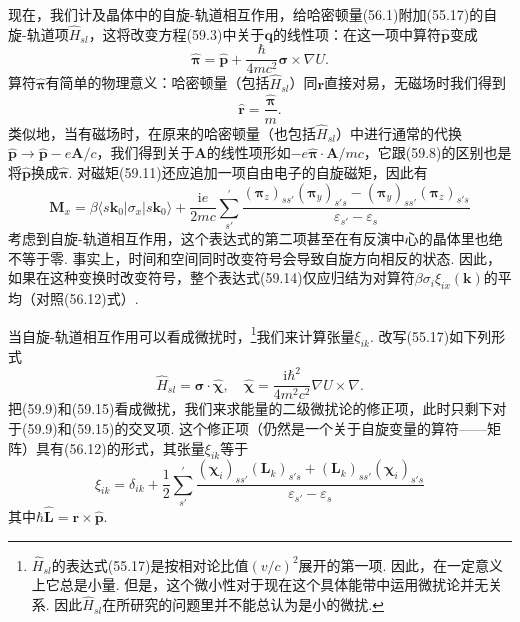 现在，我们计及晶体中的自旋-轨道相互作用，给哈密顿量(56.1)附加(55.17)的自旋-轨道项$\hat H_{sl}$，这将改变方程(59.3)中关于$\bm q$的线性项：在这一项中算符$\hat{\bm p}$变成
\begin{equation}
\hat{\bm\pi}=\hat{\bm p}+\frac{\hbar}{4mc^2}\bm\sigma\times\nabla U.
\label{59.12}
\end{equation}
算符$\hat{\bm\pi}$有简单的物理意义：哈密顿量（包括$\hat H_{sl}$）同$\bm r$直接对易，无磁场时我们得到
\begin{equation}
\hat{\bm r}=\frac{\hat{\bm\pi}}{m}.
\label{59.13}
\end{equation}
类似地，当有磁场时，在原来的哈密顿量（也包括$\hat H_{sl}$）中进行通常的代换$\hat{\bm p}\to\hat{\bm p}-e\bm A/c$，我们得到关于$\bm A$的线性项形如$-e\hat{\bm\pi}\cdot\bm A/mc$，它跟(59.8)的区别也是将$\hat{\bm p}$换成$\hat{\bm\pi}$. 对磁矩(59.11)还应追加一项自由电子的自旋磁矩，因此有
\begin{equation}
\bm M_x=\beta\langle s\bm k_0|\sigma_x|s\bm k_0\rangle+\frac{\mathrm ie}{2mc}\sum_{s'}^{\prime}
\frac{(\bm\pi_z)_{ss'}(\bm\pi_y)_{s's}-(\bm\pi_y)_{ss'}(\bm\pi_z)_{s's}}{\varepsilon_{s'}-\varepsilon_s}
\label{59.14}
\end{equation}
考虑到自旋-轨道相互作用，这个表达式的第二项甚至在有反演中心的晶体里也绝不等于零. 事实上，时间和空间同时改变符号会导致自旋方向相反的状态. 因此，如果在这种变换时改变符号，整个表达式(59.14)仅应归结为对算符$\beta\sigma_i\xi_{ix}(\bm k)$的平均（对照(56.12)式）.

当自旋-轨道相互作用可以看成微扰时，\footnote{$\hat H_{sl}$的表达式(55.17)是按相对论比值$(v/c)^2$展开的第一项. 因此，在一定意义上它总是小量. 但是，这个微小性对于现在这个具体能带中运用微扰论并无关系. 因此$\hat H_{sl}$在所研究的问题里并不能总认为是小的微扰.}我们来计算张量$\xi_{ik}$. 改写(55.17)如下列形式
\begin{equation}
\hat H_{sl}=\bm\sigma\cdot\hat{\bm\chi},\quad
\hat{\bm\chi}=\frac{\mathrm i\hbar^2}{4m^2c^2}\nabla U\times\nabla.
\label{59.15}
\end{equation}
把(59.9)和(59.15)看成微扰，我们来求能量的二级微扰论的修正项，此时只剩下对于(59.9)和(59.15)的交叉项. 这个修正项（仍然是一个关于自旋变量的算符——矩阵）具有(56.12)的形式，其张量$\xi_{ik}$等于
\begin{equation}
\xi_{ik}=\delta_{ik}+\frac{1}{2}\sum_{s'}^{\prime}
\frac{(\bm\chi_i)_{ss'}(\bm L_k)_{s's}+(\bm L_k)_{ss'}(\bm\chi_i)_{s's}}
{\varepsilon_{s'}-\varepsilon_s}
\label{59.16}
\end{equation}
其中$\hbar\hat{\bm L}=\bm r\times\hat{\bm p}$.

